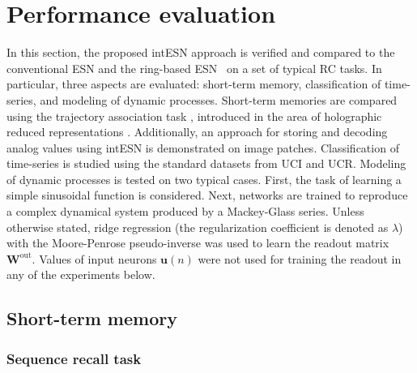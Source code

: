 



\section{Performance evaluation}
\label{sect:perf}

In this section, the proposed intESN approach is verified and compared to the conventional ESN and the ring-based ESN~\cite{MinESN} on a set of typical RC tasks.
In particular, three aspects are evaluated: short-term memory, classification of time-series, and modeling of dynamic processes.
Short-term memories are compared using the trajectory association task
\cite{PlateBook}, introduced in the area of holographic reduced representations
\cite{PlateTr}. Additionally, an approach for storing and decoding analog values using intESN is demonstrated on image patches. 
Classification of time-series is studied using the standard datasets from UCI and UCR.
Modeling of dynamic processes is tested on two typical cases. First, the task of learning a simple sinusoidal function is considered. Next, networks are trained to reproduce a complex dynamical system produced by a Mackey-Glass series.
Unless otherwise stated, ridge regression (the regularization coefficient is denoted as $\lambda$) with the  Moore-Penrose pseudo-inverse was used to learn the
readout matrix $\textbf{W}^{\text{out}}$. Values of input neurons $\textbf{u}(n)$ were not used for training the readout in any of the experiments below. 
















\subsection{Short-term memory}
\subsubsection{Sequence recall task}
\label{sect:perf:trajectory}







